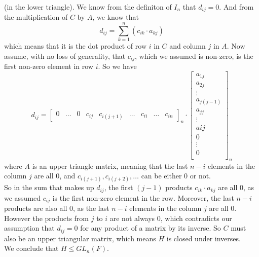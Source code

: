 \documentclass{article}
\begin{document}
    (in the lower triangle).
    We know from the definiton of $I_n$ that $d_{ij} = 0$.
    And from the multiplication of $C$ by $A$,
    we know that 
    \[ d_{ij} = \sum_{k = 1}^n (c_{ik} \cdot a_{kj}) \]
    which means that it is the dot product of row $i$ in $C$
    and column $j$ in $A$.
    Now assume, with no loss of generality,
    that $c_{ij}$, which we assumed is non-zero,
    is the first non-zero element in row $i$.
    So we have 
    \[ d_{ij} = \begin{bmatrix}
        0 & \dots & 0 & c_{ij} & c_{i(j+1)} & \dots
        & c_{ii} & \dots & c_{in}  
    \end{bmatrix}_{n}
    \cdot 
    \begin{bmatrix}
        a_{1j} \\ a_{2j} \\ \vdots \\ a_{j(j - 1)} \\ a_{jj} \\ \vdots
        \\ a{ij} \\ 0 \\ \vdots \\ 0 \\  
    \end{bmatrix}_{n} \]
    where $A$ is an upper triangle matrix, meaning that the last 
    $n - i$ elements in the column $j$ are all 0,
    and $c_{i(j + 1)}, c_{i(j + 2)}, \dots$ can be either 0 or not. \\
    So in the sum that makes up $d_{ij}$,
    the first $(j - 1)$ products $c_{ik} \cdot a_{kj}$ are all 0,
    as we assumed $c_{ij}$ is the first non-zero element in the row.
    Moreover, the last $n - i$ products are also all 0,
    as the last $n - i$ elements in the column $j$ are all 0.
    However the products from $j$ to $i$ are not always 0,
    which contradicts our assumption that $d_{ij} = 0$
    for any product of a matrix by its inverse.
    So $C$ must also be an upper triangular matrix,
    which means $H$ is closed under inverses. \\
    We conclude that $H \leqslant GL_n(F)$.
\end{document}
